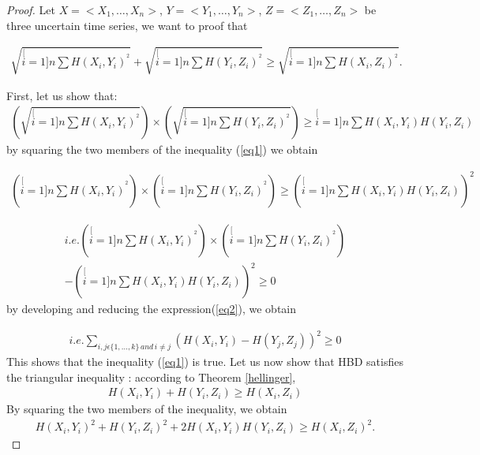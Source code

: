 \begin{proof}
Let $X=<X_1, \ldots,X_n>$, $Y=<Y_1, \ldots,Y_n>$, $Z=<Z_1, \ldots,Z_n>$ be three uncertain time series, we want to proof that

\begin{eqnarray}
\sqrt{\stackrel[i=1]{n}{\sum}H(X_{i},Y_{i})^{^{2}}}
+
\sqrt{\stackrel[i=1]{n}{\sum}H(Y_{i},Z_{i})^{^{2}}}
\geq
\sqrt{\stackrel[i=1]{n}{\sum}H(X_{i},Z_{i})^{^{2}}}.
\end{eqnarray} 


First, let us show that:
\begin{eqnarray}
\left( \sqrt{\stackrel[i=1]{n}{\sum}H(X_{i},Y_{i})^{^{2}} }\right)
\times
\left( \sqrt{\stackrel[i=1]{n}{\sum}H(Y_{i},Z_{i})^{^{2}}} \right)
\geq
\stackrel[i=1]{n}{\sum}H(X_{i},Y_{i})H(Y_{i},Z_{i})
\label{eq1}
\end{eqnarray}
by squaring the two members of the inequality (\ref{eq1}) we obtain

\begin{eqnarray}
\left( \stackrel[i=1]{n}{\sum}H(X_{i},Y_{i})^{^{2}} \right)
\times
\left( \stackrel[i=1]{n}{\sum}H(Y_{i},Z_{i})^{^{2}} \right)
\geq
\left( \stackrel[i=1]{n}{\sum}H(X_{i},Y_{i})H(Y_{i},Z_{i}) \right)^2
\end{eqnarray}

\begin{eqnarray}
i.e.
\left( \stackrel[i=1]{n}{\sum}H(X_{i},Y_{i})^{^{2}} \right)
\times
\left( \stackrel[i=1]{n}{\sum}H(Y_{i},Z_{i})^{^{2}} \right) \\
-
\left( \stackrel[i=1]{n}{\sum}H(X_{i},Y_{i})H(Y_{i},Z_{i}) \right)^2
\geq
0
\label{eq2}
\end{eqnarray}
by developing and reducing the expression(\ref{eq2}), we obtain

\begin{eqnarray}
i.e.
\underset{i,j\epsilon\{1,...,k\}\,and\,i\neq j}{\sum}\left(H(X_{i},Y_{i})-H(Y_{j},Z_{j})\right)^{2}
\geq
0
\end{eqnarray}
This shows that the inequality (\ref{eq1}) is true.
Let us now show that HBD satisfies the triangular inequality : 
according to Theorem \ref{hellinger}, 
\begin{eqnarray}
H(X_{i},Y_{i})+H(Y_{i},Z_{i})\geq H(X_{i},Z_{i})
\end{eqnarray}
By squaring the two members of the inequality, we obtain
\begin{eqnarray}
H(X_{i},Y_{i})^2+H(Y_{i},Z_{i})^2 + 2H(X_i, Y_i)H(Y_i, Z_i)\geq
H(X_{i},Z_{i})^2.
\end{eqnarray}


\end{proof}
